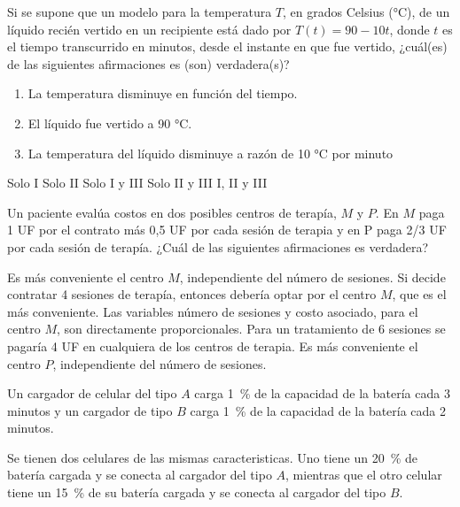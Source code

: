 \documentclass{sn-guia}
\begin{document}
\begin{problemas}
    \problema Si se supone que un modelo para la temperatura $T$, en grados Celsius (°C),
    de un líquido recién vertido en un recipiente está dado por $T(t) = 90 - 10t$, donde $t$
    es el tiempo transcurrido en minutos, desde el instante en que fue vertido, ¿cuál(es) de
    las siguientes afirmaciones es (son) verdadera(s)?

    \begin{enumerate}[label=\Roman*),leftmargin=2cm]
        \item La temperatura disminuye en función del tiempo.
        \item El líquido fue vertido a 90 °C.
        \item La temperatura del líquido disminuye a razón de 10 °C por minuto
    \end{enumerate}
    \begin{alternativas}
        \alternativa Solo I
        \alternativa Solo II
        \alternativa Solo I y III
        \alternativa Solo II y III
        \alternativa I, II y III
    \end{alternativas}

    \problema Un paciente evalúa costos en dos posibles centros de terapía, $M$ y $P$. En 
    $M$ paga 1 UF por el contrato más 0,5 UF por cada sesión de terapia y en P paga 2/3 UF
    por cada sesión de terapía. ¿Cuál de las siguientes afirmaciones es verdadera?

    \begin{alternativas}
        \alternativa Es más conveniente el centro $M$, independiente del número de sesiones.
        \alternativa Si decide contratar 4 sesiones de terapía, entonces debería optar por
        el centro $M$, que es el más conveniente.
        \alternativa Las variables número de sesiones y costo asociado, para el 
        centro $M$, son directamente proporcionales.
        \alternativa Para un tratamiento de 6 sesiones se pagaría 4 UF en cualquiera 
        de los centros de terapia. 
        \alternativa Es más conveniente el centro $P$, independiente del número de sesiones.
    \end{alternativas}

    \problema 
    Un cargador de celular del tipo $A$ carga \mbox{1 \%} de la capacidad de la batería cada 
    3 minutos y un cargador de tipo $B$ carga \mbox{1 \%} de la capacidad de la batería cada 
    2 minutos. 
    
    Se tienen dos celulares de las mismas caracteristicas. Uno tiene un \mbox{20 \%} de 
    batería cargada y se conecta al cargador del tipo $A$, mientras que el otro 
    celular tiene un \mbox{15 \%} de su batería cargada y se conecta al cargador del tipo
    $B$.


\end{problemas}
\end{document}

